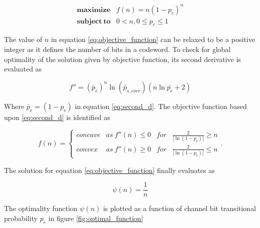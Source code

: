 \begin{equation}
\begin{array}{cc}
\mathbf{maximize}& f(n)=n(1-p_e)^n \\
\mathbf{subject~to}& 0<n, 0 \leq p_e \leq 1
\end{array}
\label{eq:objective_function}
\end{equation}

The value of $n$ in equation \ref{eq:objective_function} can be relaxed to be a positive integer as it defines the number of bits in a codeword. To check for global optimality of the solution given by objective function, its second derivative is evaluated as

\begin{equation}
f''=(\bar{p}_e)^n \ln (\bar{p}_{s,corr})(n \ln \bar{p_e} + 2)
\label{eq:second_d}
\end{equation}

Where $\bar{p}_e=(1-p_e)$ in equation \ref{eq:second_d}. The objective function based upon \ref{eq:second_d} is identified as

\begin{equation}
    f(n) = \left\{\begin{array}{cccc}
    concave & as~ f''(n) \leq 0  & for & \frac{2}{|\ln (1-p_e)|} \geq n \\
    convex & as~ f''(n) \geq 0  & for & \frac{2}{|\ln (1-p_e)|} \leq n
\end{array}   \right..
\label{eq:concavity}
\end{equation}

The solution for equation \ref{eq:objective_function} finally evaluates as

\begin{equation}
\psi (n) = \frac{1}{n}
\end{equation}

The optimality function $\psi(n)$ is plotted as a function of channel bit transitional probability $p_e$ in figure \ref{fig:optimal_function}



